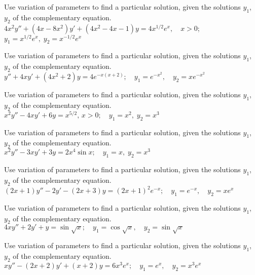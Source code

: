 \documentclass{ximera}
\begin{document}
\begin{problem}\label{exer:5.7.9}
Use variation
of parameters to find a particular solution, given the solutions
$y_1$, $y_2$ of the complementary equation. $4x^2y''+(4x-8x^2)y'+(4x^2-4x-1)y=4x^{1/2}e^x, \quad   x > 0$;
\newline $y_1=x^{1/2} e^x,\;  y_2=x^{-1/2}e^x$
\end{problem}

\begin{problem}\label{exer:5.7.10}
Use variation
of parameters to find a particular solution, given the solutions
$y_1$, $y_2$ of the complementary equation. $y''+4xy'+(4x^2+2)y=4e^{-x(x+2)};\quad   y_1=e^{-x^2},
\quad y_2=xe^{-x^2}$
\end{problem}

\begin{problem}\label{exer:5.7.11}
Use variation
of parameters to find a particular solution, given the solutions
$y_1$, $y_2$ of the complementary equation. $x^2y''-4xy'+6y=x^{5/2},\, x > 0;\quad  y_1=x^2,\;  y_2=x^3$
\end{problem}

\begin{problem}\label{exer:5.7.12}
Use variation
of parameters to find a particular solution, given the solutions
$y_1$, $y_2$ of the complementary equation. $x^2y''-3xy'+3y=2x^4\sin x; \quad  y_1=x,\;  y_2=x^3$
\end{problem}

\begin{problem}\label{exer:5.7.13}
Use variation
of parameters to find a particular solution, given the solutions
$y_1$, $y_2$ of the complementary equation. $(2x+1)y''-2y'-(2x+3)y=(2x+1)^2e^{-x}; \quad  y_1=e^{-x},
\quad y_2=xe^x$
\end{problem}

\begin{problem}\label{exer:5.7.14}
Use variation
of parameters to find a particular solution, given the solutions
$y_1$, $y_2$ of the complementary equation. $4xy''+2y'+y=\sin\sqrt x; \quad  y_1=\cos\sqrt x,
\quad y_2=\sin\sqrt x$
\end{problem}

\begin{problem}\label{exer:5.7.15}
Use variation
of parameters to find a particular solution, given the solutions
$y_1$, $y_2$ of the complementary equation. $xy''-(2x+2)y'+(x+2)y=6x^3e^x;\quad  y_1=e^x,\quad  y_2=x^3e^x$
\end{problem}
\end{document}
